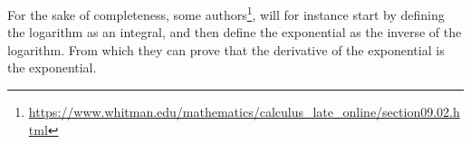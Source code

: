 \documentclass[solutions.tex]{subfiles}
\begin{document}
\begin{remark} For the sake of completeness, some authors\footnote{
\url{https://www.whitman.edu/mathematics/calculus\_late\_online/section09.02.html}},
will for instance start by defining the logarithm as an integral,
and then define the exponential as the inverse of the logarithm. From which
they can prove that the derivative of the exponential is the exponential.
\end{remark}
\end{document}
